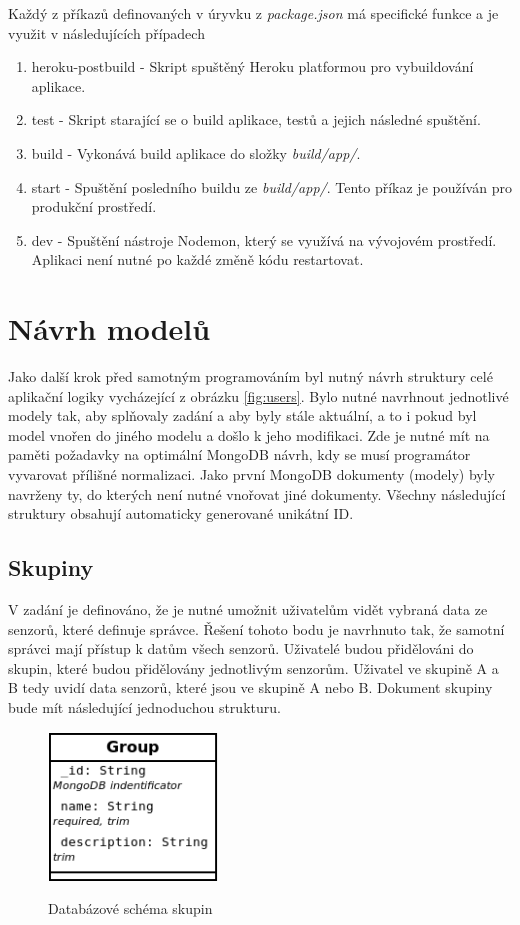 \documentclass[thesis=M,czech]{FITthesis}[2018/10/20]
\begin{document}
Každý z příkazů definovaných v úryvku z \textit{package.json} má specifické funkce a je využit v následujících případech
\begin{enumerate}
\item heroku-postbuild - Skript spuštěný Heroku platformou pro vybuildování aplikace.
\item test - Skript starající se o build aplikace, testů a jejich následné spuštění.
\item build - Vykonává build aplikace do složky \textit{build/app/}.
\item start - Spuštění posledního buildu ze \textit{build/app/}. Tento příkaz je používán pro produkční prostředí.
\item dev - Spuštění nástroje Nodemon, který se využívá na vývojovém prostředí. Aplikaci není nutné po každé změně kódu restartovat.
\end{enumerate}
\newpage
\section{Návrh modelů}
Jako další krok před samotným programováním byl nutný návrh struktury celé aplikační logiky vycházející z obrázku \ref{fig:users}. Bylo nutné navrhnout jednotlivé modely tak, aby splňovaly zadání a aby byly stále aktuální, a to i pokud byl model vnořen do jiného modelu a došlo k jeho modifikaci. Zde je nutné mít na paměti požadavky na optimální MongoDB návrh, kdy se musí programátor vyvarovat přílišné normalizaci. Jako první MongoDB dokumenty (modely) byly navrženy ty, do kterých není nutné vnořovat jiné dokumenty. Všechny následující struktury obsahují automaticky generované unikátní ID.

\subsection{Skupiny}
V zadání je definováno, že je nutné umožnit uživatelům vidět vybraná data ze senzorů, které definuje správce. Řešení tohoto bodu je navrhnuto tak, že samotní správci mají přístup k datům všech senzorů. Uživatelé budou přidělováni do skupin, které budou přidělovány jednotlivým senzorům. Uživatel ve skupině A a B tedy uvidí data senzorů, které jsou ve skupině A nebo B. Dokument skupiny bude mít následující jednoduchou strukturu. 

\begin{figure}[h]
\caption{Databázové schéma skupin}
\centering
\includegraphics[width=0.40\textwidth]{diagrams/group}
\label{fig:group_schema}
\end{figure}
\newpage
\end{document}

